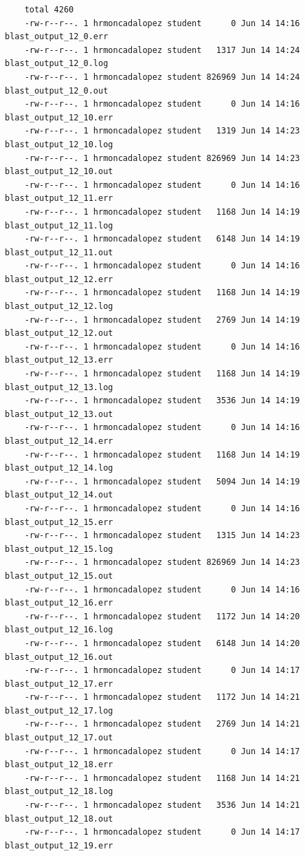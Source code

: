 \documentclass{article}
\begin{document}
\begin{itemize}
\begin{verbatim}
    total 4260
    -rw-r--r--. 1 hrmoncadalopez student      0 Jun 14 14:16 blast_output_12_0.err
    -rw-r--r--. 1 hrmoncadalopez student   1317 Jun 14 14:24 blast_output_12_0.log
    -rw-r--r--. 1 hrmoncadalopez student 826969 Jun 14 14:24 blast_output_12_0.out
    -rw-r--r--. 1 hrmoncadalopez student      0 Jun 14 14:16 blast_output_12_10.err
    -rw-r--r--. 1 hrmoncadalopez student   1319 Jun 14 14:23 blast_output_12_10.log
    -rw-r--r--. 1 hrmoncadalopez student 826969 Jun 14 14:23 blast_output_12_10.out
    -rw-r--r--. 1 hrmoncadalopez student      0 Jun 14 14:16 blast_output_12_11.err
    -rw-r--r--. 1 hrmoncadalopez student   1168 Jun 14 14:19 blast_output_12_11.log
    -rw-r--r--. 1 hrmoncadalopez student   6148 Jun 14 14:19 blast_output_12_11.out
    -rw-r--r--. 1 hrmoncadalopez student      0 Jun 14 14:16 blast_output_12_12.err
    -rw-r--r--. 1 hrmoncadalopez student   1168 Jun 14 14:19 blast_output_12_12.log
    -rw-r--r--. 1 hrmoncadalopez student   2769 Jun 14 14:19 blast_output_12_12.out
    -rw-r--r--. 1 hrmoncadalopez student      0 Jun 14 14:16 blast_output_12_13.err
    -rw-r--r--. 1 hrmoncadalopez student   1168 Jun 14 14:19 blast_output_12_13.log
    -rw-r--r--. 1 hrmoncadalopez student   3536 Jun 14 14:19 blast_output_12_13.out
    -rw-r--r--. 1 hrmoncadalopez student      0 Jun 14 14:16 blast_output_12_14.err
    -rw-r--r--. 1 hrmoncadalopez student   1168 Jun 14 14:19 blast_output_12_14.log
    -rw-r--r--. 1 hrmoncadalopez student   5094 Jun 14 14:19 blast_output_12_14.out
    -rw-r--r--. 1 hrmoncadalopez student      0 Jun 14 14:16 blast_output_12_15.err
    -rw-r--r--. 1 hrmoncadalopez student   1315 Jun 14 14:23 blast_output_12_15.log
    -rw-r--r--. 1 hrmoncadalopez student 826969 Jun 14 14:23 blast_output_12_15.out
    -rw-r--r--. 1 hrmoncadalopez student      0 Jun 14 14:16 blast_output_12_16.err
    -rw-r--r--. 1 hrmoncadalopez student   1172 Jun 14 14:20 blast_output_12_16.log
    -rw-r--r--. 1 hrmoncadalopez student   6148 Jun 14 14:20 blast_output_12_16.out
    -rw-r--r--. 1 hrmoncadalopez student      0 Jun 14 14:17 blast_output_12_17.err
    -rw-r--r--. 1 hrmoncadalopez student   1172 Jun 14 14:21 blast_output_12_17.log
    -rw-r--r--. 1 hrmoncadalopez student   2769 Jun 14 14:21 blast_output_12_17.out
    -rw-r--r--. 1 hrmoncadalopez student      0 Jun 14 14:17 blast_output_12_18.err
    -rw-r--r--. 1 hrmoncadalopez student   1168 Jun 14 14:21 blast_output_12_18.log
    -rw-r--r--. 1 hrmoncadalopez student   3536 Jun 14 14:21 blast_output_12_18.out
    -rw-r--r--. 1 hrmoncadalopez student      0 Jun 14 14:17 blast_output_12_19.err

\end{verbatim}
\end{itemize}
\end{document}
